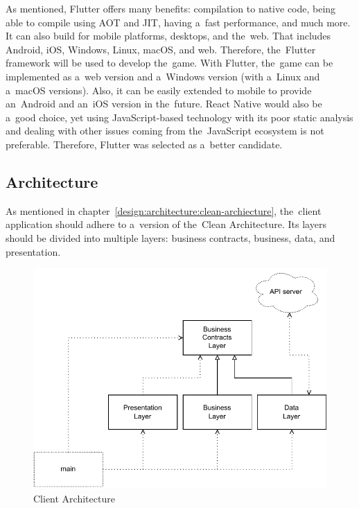 As mentioned, Flutter offers many benefits: compilation to native code, being able to compile using AOT and JIT, having a~fast performance, and much more.
It can also build for mobile platforms, desktops, and the~web.
That includes Android, iOS, Windows, Linux, macOS, and web.
Therefore, the~Flutter framework will be used to develop the~game.
With Flutter, the~game can be implemented as a~web version and a~Windows version (with a~Linux and a~macOS versions).
Also, it can be easily extended to mobile to provide an~Android and an~iOS version in the~future.
React Native would also be a~good choice, yet using JavaScript-based technology with its poor static analysis and dealing with other issues coming from the~JavaScript ecosystem is not preferable.
Therefore, Flutter was selected as a~better candidate.

\subsection{Architecture}

As mentioned in chapter~\ref{design:architecture:clean-archiecture}, the~client application should adhere to a~version of the~Clean Architecture.
Its layers should be divided into multiple layers: business contracts, business, data, and presentation.

\begin{figure}
    \centering
    \includegraphics[width=1\linewidth]{assets/design/clientarchitecture.pdf}
    \caption{Client Architecture}
    \label{fig:design:clientarchitecture}
\end{figure}

